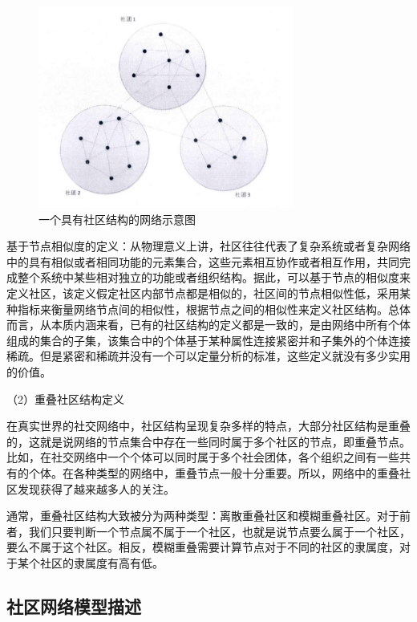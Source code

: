 \begin{figure}
  \centering
  \includegraphics[width=0.75\textwidth]{figures/fig2-1}
  \caption{一个具有社区结构的网络示意图}\label{fig:fig2-1}
\end{figure}

 基于节点相似度的定义：从物理意义上讲，社区往往代表了复杂系统或者复杂网络中的具有相似或者相同功能的元素集合，这些元素相互协作或者相互作用，共同完成整个系统中某些相对独立的功能或者组织结构。据此，可以基于节点的相似度来定义社区，该定义假定社区内部节点都是相似的，社区间的节点相似性低，采用某种指标来衡量网络节点间的相似性，根据节点之间的相似性来定义社区结构。总体而言，从本质内涵来看，已有的社区结构的定义都是一致的，是由网络中所有个体组成的集合的子集，该集合中的个体基于某种属性连接紧密并和子集外的个体连接稀疏。但是紧密和稀疏并没有一个可以定量分析的标准，这些定义就没有多少实用的价值。

 （2）重叠社区结构定义

	在真实世界的社交网络中，社区结构呈现复杂多样的特点，大部分社区结构是重叠的，这就是说网络的节点集合中存在一些同时属于多个社区的节点，即重叠节点。比如，在社交网络中一个个体可以同时属于多个社会团体，各个组织之间有一些共有的个体。在各种类型的网络中，重叠节点一般十分重要。所以，网络中的重叠社区发现获得了越来越多人的关注。
  
  通常，重叠社区结构大致被分为两种类型：离散重叠社区和模糊重叠社区。对于前者，我们只要判断一个节点属不属于一个社区，也就是说节点要么属于一个社区，要么不属于这个社区。相反，模糊重叠需要计算节点对于不同的社区的隶属度，对于某个社区的隶属度有高有低。

\subsection{社区网络模型描述}

